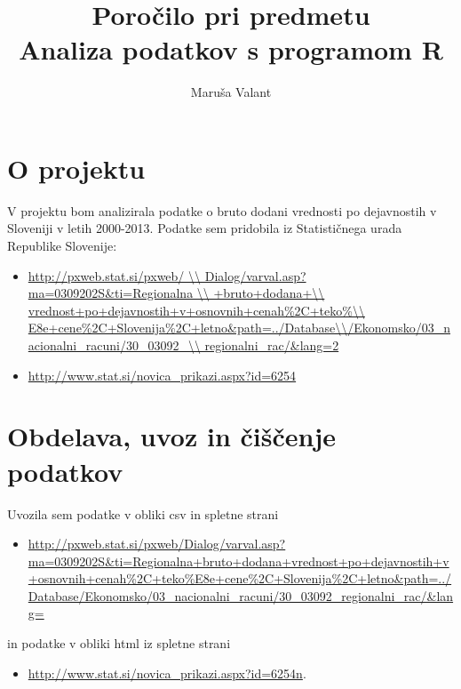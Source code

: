 \documentclass[a4paper, 11pt]{article}
\begin{document}
\title{Poročilo pri predmetu \\
Analiza podatkov s programom R}
\author{Maruša Valant}

\section{O projektu}

V projektu bom analizirala podatke o bruto dodani vrednosti po dejavnostih v Sloveniji v letih 2000-2013. Podatke sem pridobila iz Statističnega urada Republike Slovenije:

\begin{itemize}
\item{\url{http://pxweb.stat.si/pxweb/ \\
Dialog/varval.asp?ma=0309202S&ti=Regionalna \\
+bruto+dodana+\\
vrednost+po+dejavnostih+v+osnovnih+cenah%
E8e+cene%
regionalni_rac/&lang=2}}
\item{\url{http://www.stat.si/novica_prikazi.aspx?id=6254}}

\end{itemize}

\section{Obdelava, uvoz in čiščenje podatkov}

Uvozila sem podatke v obliki csv in spletne strani

\begin{itemize}
 \item{\url{http://pxweb.stat.si/pxweb/Dialog/varval.asp?ma=0309202S&ti=Regionalna+bruto+dodana+vrednost+po+dejavnostih+v+osnovnih+cenah%2C+teko%E8e+cene%2C+Slovenija%2C+letno&path=../Database/Ekonomsko/03_nacionalni_racuni/30_03092_regionalni_rac/&lang= }} 
\end{itemize}
in podatke v obliki html iz spletne strani 
\begin{itemize}
\item{\url{http://www.stat.si/novica_prikazi.aspx?id=6254n}}.
\end{itemize}
\end{document}

